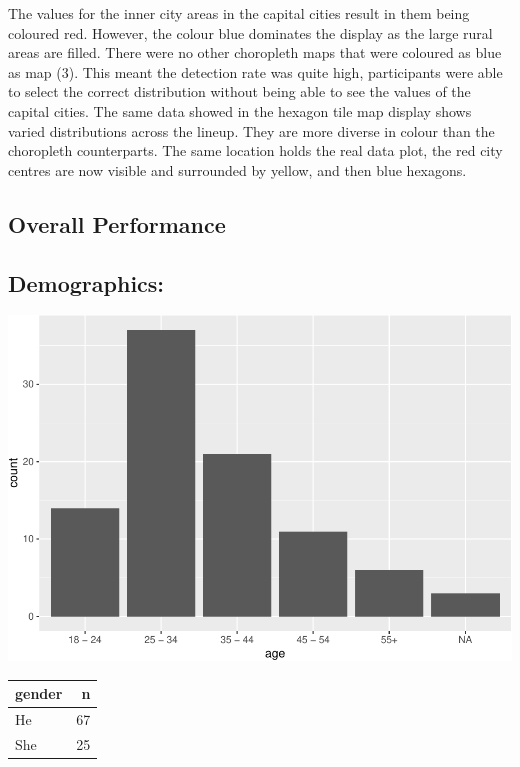 \documentclass[conference,final,]{IEEEtran}
\makeatletter
\def\maxwidth{\ifdim\Gin@nat@width>\linewidth\linewidth
\else\Gin@nat@width\fi}
\let\Oldincludegraphics\includegraphics
\renewcommand{\includegraphics}[1]{\Oldincludegraphics[width=\maxwidth]{#1}}
\makeatother
\begin{document}
The values for the inner city areas in the capital cities result in them
being coloured red. However, the colour blue dominates the display as
the large rural areas are filled. There were no other choropleth maps
that were coloured as blue as map (3). This meant the detection rate was
quite high, participants were able to select the correct distribution
without being able to see the values of the capital cities. The same
data showed in the hexagon tile map display shows varied distributions
across the lineup. They are more diverse in colour than the choropleth
counterparts. The same location holds the real data plot, the red city
centres are now visible and surrounded by yellow, and then blue
hexagons.

\hypertarget{overall-performance}{%
\subsection{Overall Performance}\label{overall-performance}}

\hypertarget{demographics}{%
\subsection{Demographics:}\label{demographics}}

\includegraphics{paper_files/figure-latex/demogs-1.pdf}

\begin{tabular}{lr}
\toprule
gender & n\\
\midrule
He & 67\\
She & 25\\
\bottomrule
\end{tabular}
\end{document}
